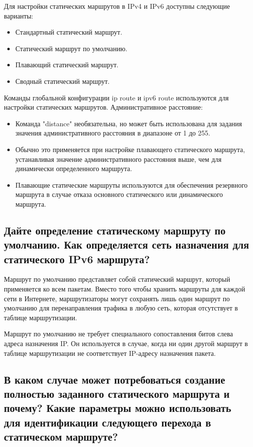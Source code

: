 Для настройки статических маршрутов в IPv4 и IPv6 доступны следующие варианты:

\begin{itemize}
	\item Стандартный статический маршрут.
	\item Статический маршрут по умолчанию.
	\item Плавающий статический маршрут.
	\item Сводный статический маршрут.
\end{itemize}

Команды глобальной конфигурации ip route и ipv6 route используются
для настройки статических маршрутов.
Административное расстояние:

\begin{itemize}
	\item Команда "distance" необязательна,
		но может быть использована для задания значения административного
		расстояния в диапазоне от 1 до 255.
	\item Обычно это применяется при настройке плавающего
		статического маршрута, устанавливая значение административного
		расстояния выше, чем для динамически определенного маршрута.
	\item Плавающие статические маршруты используются
		для обеспечения резервного маршрута в случае отказа основного
		статического или динамического маршрута.
\end{itemize}

\subsection{Дайте определение статическому маршруту по умолчанию.
	Как определяется сеть назначения для статического IPv6 маршрута?}

Маршрут по умолчанию представляет собой статический маршрут,
который применяется ко всем пакетам.
Вместо того чтобы хранить маршруты для каждой сети в Интернете,
маршрутизаторы могут сохранять лишь один маршрут по умолчанию
для перенаправления трафика в любую сеть,
которая отсутствует в таблице маршрутизации.\par
Маршрут по умолчанию не требует специального сопоставления битов
слева адреса назначения IP. Он используется в случае,
когда ни один другой маршрут в таблице маршрутизации не соответствует
IP-адресу назначения пакета.

\subsection{В каком случае может потребоваться создание полностью заданного
	статического маршрута и почему?
	Какие параметры можно использовать для идентификации следующего перехода
	в статическом маршруте?}

